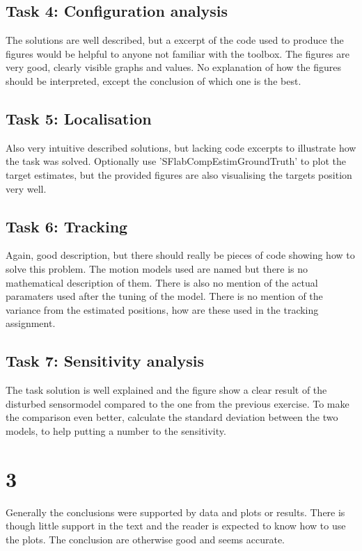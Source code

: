 \documentclass[10pt,a4paper]{report}
\begin{document}
\subsection*{Task 4: Configuration analysis}
The solutions are well described, but a excerpt of the code used to produce the figures would be helpful to anyone not familiar with the toolbox. 
The figures are very good, clearly visible graphs and values.
No explanation of how the figures should be interpreted, except the conclusion of which one is the best.

\subsection*{Task 5: Localisation}
Also very intuitive described solutions, but lacking code excerpts to illustrate how the task was solved. 
Optionally use 'SFlabCompEstimGroundTruth' to plot the target estimates, but the provided figures are also visualising the targets position very well.

\subsection*{Task 6: Tracking}
Again, good description, but there should really be pieces of code showing how to solve this problem.
The motion models used are named but there is no mathematical description of them.
There is also no mention of the actual paramaters used after the tuning of the model.
There is no mention of the variance from the estimated positions, how are these used in the tracking assignment.

\subsection*{Task 7: Sensitivity analysis}
The task solution is well explained and the figure show a clear result of the disturbed sensormodel compared to the one from the previous exercise. 
To make the comparison even better, calculate the standard deviation between the two models, to help putting a number to the sensitivity.

\section*{3}
Generally the conclusions were supported by data and plots or results.
There is though little support in the text and the reader is expected to know how to use the plots.
The conclusion are otherwise good and seems accurate.
\end{document}
